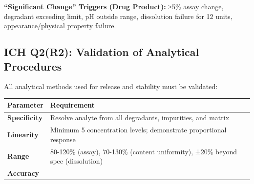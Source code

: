 \documentclass[
  11pt,
  a4paper,
]{report}
\begin{document}
\textbf{``Significant Change'' Triggers (Drug Product):} ≥5\% assay
change, degradant exceeding limit, pH outside range, dissolution failure
for 12 units, appearance/physical property failure.

\hypertarget{ich-q2r2-validation-of-analytical-procedures}{%
\subsection{ICH Q2(R2): Validation of Analytical
Procedures}\label{ich-q2r2-validation-of-analytical-procedures}}

All analytical methods used for release and stability must be validated:

\begin{longtable}[]{@{}ll@{}}
\toprule
\begin{minipage}[b]{0.43\columnwidth}\raggedright
Parameter\strut
\end{minipage} & \begin{minipage}[b]{0.51\columnwidth}\raggedright
Requirement\strut
\end{minipage}\tabularnewline
\midrule
\endhead
\begin{minipage}[t]{0.43\columnwidth}\raggedright
\textbf{Specificity}\strut
\end{minipage} & \begin{minipage}[t]{0.51\columnwidth}\raggedright
Resolve analyte from all degradants, impurities, and matrix\strut
\end{minipage}\tabularnewline
\begin{minipage}[t]{0.43\columnwidth}\raggedright
\textbf{Linearity}\strut
\end{minipage} & \begin{minipage}[t]{0.51\columnwidth}\raggedright
Minimum 5 concentration levels; demonstrate proportional response\strut
\end{minipage}\tabularnewline
\begin{minipage}[t]{0.43\columnwidth}\raggedright
\textbf{Range}\strut
\end{minipage} & \begin{minipage}[t]{0.51\columnwidth}\raggedright
80-120\% (assay), 70-130\% (content uniformity), ±20\% beyond spec
(dissolution)\strut
\end{minipage}\tabularnewline
\begin{minipage}[t]{0.43\columnwidth}\raggedright
\textbf{Accuracy}\strut
\end{minipage} & \begin{minipage}[t]{0.51\columnwidth}\raggedright

\end{minipage}
\end{longtable}
\end{document}
